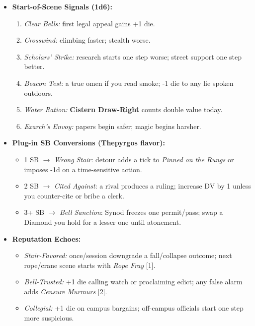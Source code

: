 \begin{itemize}
  \item \textbf{Start-of-Scene Signals (1d6):}
  \begin{enumerate}
    \item \emph{Clear Bells:} first legal appeal gains +1 die.
    \item \emph{Crosswind:} climbing faster; stealth worse.
    \item \emph{Scholars’ Strike:} research starts one step worse; street support one step better.
    \item \emph{Beacon Test:} a true omen if you read smoke; -1 die to any lie spoken outdoors.
    \item \emph{Water Ration:} \textbf{Cistern Draw-Right} counts double value today.
    \item \emph{Exarch’s Envoy:} papers begin safer; magic begins harsher.
  \end{enumerate}

  \item \textbf{Plug-in SB Conversions (Thepyrgos flavor):}
  \begin{itemize}
    \item 1 SB \(\rightarrow\) \emph{Wrong Stair}: detour adds a tick to \emph{Pinned on the Rungs} or imposes -1d on a time-sensitive action.
    \item 2 SB \(\rightarrow\) \emph{Cited Against}: a rival produces a ruling; increase DV by 1 unless you counter-cite or bribe a clerk.
    \item 3+ SB \(\rightarrow\) \emph{Bell Sanction}: Synod freezes one permit/pass; swap a Diamond you hold for a lesser one until atonement.
  \end{itemize}

  \item \textbf{Reputation Echoes:}
  \begin{itemize}
    \item \emph{Stair-Favored:} once/session downgrade a fall/collapse outcome; next rope/crane scene starts with \emph{Rope Fray} [1].
    \item \emph{Bell-Trusted:} +1 die calling watch or proclaiming edict; any false alarm adds \emph{Censure Murmurs} [2].
    \item \emph{Collegial:} +1 die on campus bargains; off-campus officials start one step more suspicious.
  \end{itemize}
\end{itemize}

